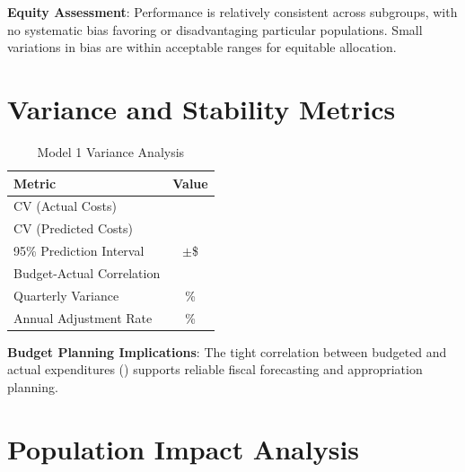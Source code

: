 \textbf{Equity Assessment}: Performance is relatively consistent across subgroups, with no systematic bias favoring or disadvantaging particular populations. Small variations in bias are within acceptable ranges for equitable allocation.

\section{Variance and Stability Metrics}

\begin{table}[h]
\centering
\caption{Model 1 Variance Analysis}
\begin{tabular}{lc}
\toprule
\textbf{Metric} & \textbf{Value} \\
\midrule
CV (Actual Costs) & \ModelOneCVActual{} \\
CV (Predicted Costs) & \ModelOneCVPredicted{} \\
95\% Prediction Interval & $\pm$\$\ModelOnePredictionInterval{} \\
Budget-Actual Correlation & \ModelOneBudgetActualCorr{} \\
Quarterly Variance & \ModelOneQuarterlyVariance{}\% \\
Annual Adjustment Rate & \ModelOneAnnualAdjustmentRate{}\% \\
\bottomrule
\end{tabular}
\end{table}

\textbf{Budget Planning Implications}: The tight correlation between budgeted and actual expenditures (\ModelOneBudgetActualCorr{}) supports reliable fiscal forecasting and appropriation planning.

\section{Population Impact Analysis}

